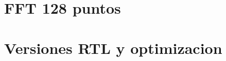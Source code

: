 \documentclass[t]{beamer}
\begin{document}
\section{}

\section{}
\section{FFT 128 puntos}



\section{Versiones RTL y optimizacion}
\end{document}
